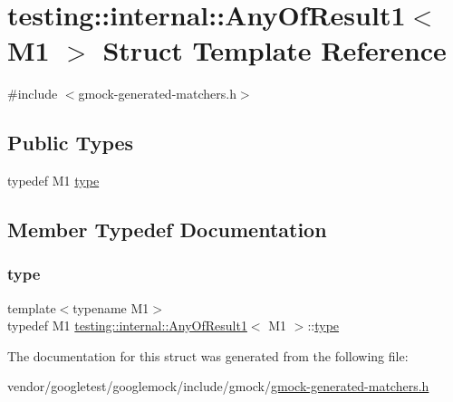 \hypertarget{structtesting_1_1internal_1_1_any_of_result1}{}\section{testing\+:\+:internal\+:\+:Any\+Of\+Result1$<$ M1 $>$ Struct Template Reference}
\label{structtesting_1_1internal_1_1_any_of_result1}


{\ttfamily \#include $<$gmock-\/generated-\/matchers.\+h$>$}

\subsection*{Public Types}
\begin{DoxyCompactItemize}
\item 
typedef M1 \hyperlink{structtesting_1_1internal_1_1_any_of_result1_a4c55b5cf196c93e2a822bc99625f6797}{type}
\end{DoxyCompactItemize}


\subsection{Member Typedef Documentation}
\mbox{\label{structtesting_1_1internal_1_1_any_of_result1_a4c55b5cf196c93e2a822bc99625f6797}} 
\subsubsection{\texorpdfstring{type}{type}}
{\footnotesize\ttfamily template$<$typename M1$>$ \\
typedef M1 \hyperlink{structtesting_1_1internal_1_1_any_of_result1}{testing\+::internal\+::\+Any\+Of\+Result1}$<$ M1 $>$\+::\hyperlink{structtesting_1_1internal_1_1_any_of_result1_a4c55b5cf196c93e2a822bc99625f6797}{type}}



The documentation for this struct was generated from the following file\+:\begin{DoxyCompactItemize}
\item 
vendor/googletest/googlemock/include/gmock/\hyperlink{gmock-generated-matchers_8h}{gmock-\/generated-\/matchers.\+h}\end{DoxyCompactItemize}
